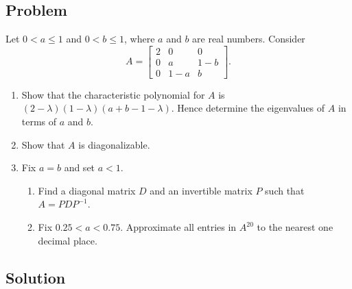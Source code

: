 \documentclass[12pt]{article}
\begin{document}
\subsection{Problem}
Let $0<a\le1$ and $0<b\le1$, where $a$ and $b$ are real numbers. Consider
\[
A=\begin{bmatrix}
2&0&0\\
0&a&1-b\\
0&1-a&b
\end{bmatrix}.
\]
\begin{enumerate}[label=(\alph*)]
  \item Show that the characteristic polynomial for $A$ is $(2-\lambda)(1-\lambda)(a+b-1-\lambda)$. Hence determine the eigenvalues of $A$ in terms of $a$ and $b$.
  \item Show that $A$ is diagonalizable.
  \item Fix $a=b$ and set $a<1$.
  \begin{enumerate}[label=(\roman*)]
    \item Find a diagonal matrix $D$ and an invertible matrix $P$ such that $A=PDP^{-1}$.
    \item Fix $0.25<a<0.75$. Approximate all entries in $A^{20}$ to the nearest one decimal place.
  \end{enumerate}
\end{enumerate}

\newpage
\subsection{Solution}
\end{document}
